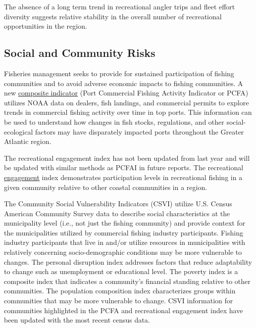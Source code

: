 \documentclass[
  10pt,
]{article}
\begin{document}
The absence of a long term trend in recreational angler trips and fleet effort diversity suggests relative stability in the overall number of recreational opportunities in the region.

\newpage

\subsection{Social and Community Risks}\label{social-and-community-risks}

Fisheries management seeks to provide for sustained participation of fishing communities and to avoid adverse economic impacts to fishing communities. A new \href{https://noaa-edab.github.io/catalog/engagement.html?q=engage\#introduction-to-indicator-72}{composite indicator} (Port Commercial Fishing Activity Indicator or PCFA) utilizes NOAA data on dealers, fish landings, and commercial permits to explore trends in commercial fishing activity over time in top ports. This information can be used to understand how changes in fish stocks, regulations, and other social-ecological factors may have disparately impacted ports throughout the Greater Atlantic region.

The recreational engagement index has not been updated from last year and will be updated with similar methods as PCFAI in future reports. The recreational \href{https://noaa-edab.github.io/catalog/engagement.html}{engagement} index demonstrates participation levels in recreational fishing in a given community relative to other coastal communities in a region.

The Community Social Vulnerability Indicators (CSVI) utilize U.S. Census American Community Survey data to describe social characteristics at the municipality level (i.e., not just the fishing community) and provide context for the municipalities utilized by commercial fishing industry participants. Fishing industry participants that live in and/or utilize resources in municipalities with relatively concerning socio-demographic conditions may be more vulnerable to changes. The personal disruption index addresses factors that reduce adaptability to change such as unemployment or educational level. The poverty index is a composite index that indicates a community's financial standing relative to other communities. The population composition index characterizes groups within communities that may be more vulnerable to change. CSVI information for communities highlighted in the PCFA and recreational engagement index have been updated with the most recent census data.
\end{document}
